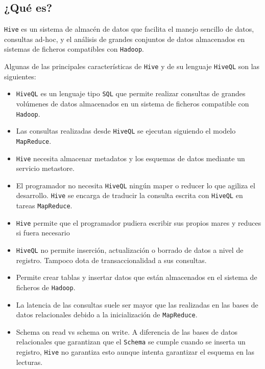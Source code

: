\documentclass[]{article}
\begin{document}
\subsection{¿Qué es?}\label{que-es-4}

\texttt{Hive} es un sistema de almacén de datos que facilita el manejo
sencillo de datos, consultas ad-hoc, y el análisis de grandes conjuntos
de datos almacenados en sistemas de ficheros compatibles con
\texttt{Hadoop}.

Algunas de las principales características de \texttt{Hive} y de su
lenguaje \texttt{HiveQL} son las siguientes:

\begin{itemize}
\itemsep1pt\parskip0pt
\item
  \texttt{HiveQL} es un lenguaje tipo \texttt{SQL} que permite realizar
  consultas de grandes volúmenes de datos almacenados en un sistema de
  ficheros compatible con \texttt{Hadoop}.
\item
  Las consultas realizadas desde \texttt{HiveQL} se ejecutan siguiendo
  el modelo \texttt{MapReduce}.
\item
  \texttt{Hive} necesita almacenar metadatos y los esquemas de datos
  mediante un servicio metastore.
\item
  El programador no necesita \texttt{HiveQL} ningún maper o reducer lo
  que agiliza el desarrollo. \texttt{Hive} se encarga de traducir la
  consulta escrita con \texttt{HiveQL} en tareas \texttt{MapReduce}.
\item
  \texttt{Hive} permite que el programador pudiera escribir sus propios
  mares y reduces si fuera necesario
\item
  \texttt{HiveQL} no permite inserción, actualización o borrado de datos
  a nivel de registro. Tampoco dota de transaccionalidad a sus
  consultas.
\item
  Permite crear tablas y insertar datos que están almacenados en el
  sistema de ficheros de \texttt{Hadoop}.
\item
  La latencia de las consultas suele ser mayor que las realizadas en las
  bases de datos relacionales debido a la inicialización de
  \texttt{MapReduce}.
\item
  Schema on read vs schema on write. A diferencia de las bases de datos
  relacionales que garantizan que el \texttt{Schema} se cumple cuando se
  inserta un registro, \texttt{Hive} no garantiza esto aunque intenta
  garantizar el esquema en las lecturas.
\end{itemize}
\end{document}
